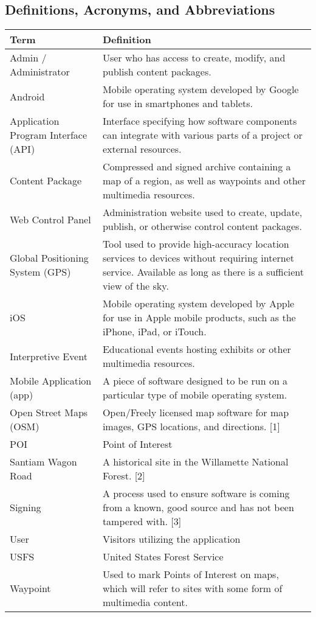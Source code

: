 \documentclass[letterpaper, 10pt,titlepage]{article}
\begin{document}
\subsection{Definitions, Acronyms, and Abbreviations }
\begin{table}[ht]
\begin{tabular}{| l | p{9cm} |}
\hline
\textbf{Term} & \textbf{Definition} \\ \hline
Admin / Administrator & User who has access to create, modify, and publish content packages. \\ \hline
Android & Mobile operating system developed by Google for use in smartphones and tablets. \\ \hline
Application Program Interface (API) & Interface specifying how software components can integrate with various parts of a project or external resources. \\ \hline
Content Package & Compressed and signed archive containing a map of a region, as well as waypoints and other multimedia resources. \\ \hline
Web Control Panel & Administration website used to create, update, publish, or otherwise control content packages. \\ \hline
Global Positioning System (GPS) & Tool used to provide high-accuracy location services to devices without requiring internet service. Available as long as there is a sufficient view of the sky. \\ \hline
iOS & Mobile operating system developed by Apple for use in Apple mobile products, such as the iPhone, iPad, or iTouch. \\ \hline
Interpretive Event & Educational events hosting exhibits or other multimedia resources. \\ \hline
Mobile Application (app) & A piece of software designed to be run on a particular type of mobile operating system. \\ \hline
Open Street Maps (OSM) & Open/Freely licensed map software for map images, GPS locations, and directions. {[}1{]} \\ \hline
POI & Point of Interest \\ \hline
Santiam Wagon Road & A historical site in the Willamette National Forest. [2] \\ \hline
Signing & A process used to ensure software is coming from a known, good source and has not been tampered with. [3]\\ \hline
User & Visitors utilizing the application \\ \hline
USFS & United States Forest Service \\ \hline
Waypoint & Used to mark Points of Interest on maps, which will refer to sites with some form of multimedia content. \\ \hline
\end{tabular}
\end{table}                                                
\end{document}
